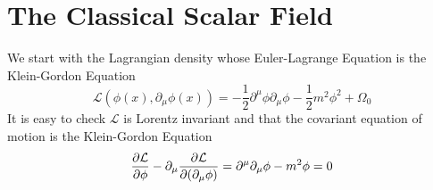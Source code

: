 \section{The Classical Scalar Field}
We start with the Lagrangian density whose Euler-Lagrange Equation is the Klein-Gordon Equation
\begin{equation}
    \mathcal{L}(\phi(x),\partial_\mu\phi(x))=-\frac{1}{2}\partial^\mu\phi\partial_\mu\phi-\frac{1}{2}m^2\phi^2+\Omega_0
    \label{scalar_field_lagrangian}
\end{equation}
It is easy to check $\mathcal{L}$ is Lorentz invariant and that the covariant equation of motion is the Klein-Gordon Equation
\begin{equation}
    \pdv{\mathcal{L}}{\phi}-\partial_\mu\pdv{\mathcal{L}}{(\partial_\mu\phi)}=\partial^\mu\partial_\mu\phi-m^2\phi=0
    \label{kg_euler}
\end{equation}
